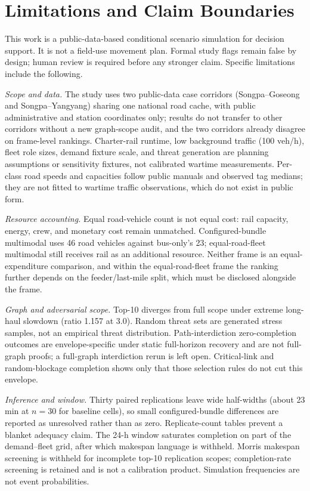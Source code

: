\documentclass{ieeeaccess}
\begin{document}
\section{Limitations and Claim Boundaries}
\label{sec:limits}
This work is a public-data-based conditional scenario simulation for decision support. It is not a field-use movement plan. Formal study flags remain false by design; human review is required before any stronger claim. Specific limitations include the following.

\emph{Scope and data.} The study uses two public-data case corridors (Songpa--Goseong and Songpa--Yangyang) sharing one national road cache, with public administrative and station coordinates only; results do not transfer to other corridors without a new graph-scope audit, and the two corridors already disagree on frame-level rankings. Charter-rail runtime, low background traffic (100 veh/h), fleet role sizes, demand fixture scale, and threat generation are planning assumptions or sensitivity fixtures, not calibrated wartime measurements. Per-class road speeds and capacities follow public manuals and observed tag medians; they are not fitted to wartime traffic observations, which do not exist in public form.

\emph{Resource accounting.} Equal road-vehicle count is not equal cost: rail capacity, energy, crew, and monetary cost remain unmatched. Configured-bundle multimodal uses 46 road vehicles against bus-only's 23; equal-road-fleet multimodal still receives rail as an additional resource. Neither frame is an equal-expenditure comparison, and within the equal-road-fleet frame the ranking further depends on the feeder/last-mile split, which must be disclosed alongside the frame.

\emph{Graph and adversarial scope.} Top-10 diverges from full scope under extreme long-haul slowdown (ratio 1.157 at 3.0). Random threat sets are generated stress samples, not an empirical threat distribution. Path-interdiction zero-completion outcomes are envelope-specific under static full-horizon recovery and are not full-graph proofs; a full-graph interdiction rerun is left open. Critical-link and random-blockage completion shows only that those selection rules do not cut this envelope.

\emph{Inference and window.} Thirty paired replications leave wide half-widths (about 23 min at $n{=}30$ for baseline cells), so small configured-bundle differences are reported as unresolved rather than as zero. Replicate-count tables prevent a blanket adequacy claim. The 24-h window saturates completion on part of the demand--fleet grid, after which makespan language is withheld. Morris makespan screening is withheld for incomplete top-10 replication scopes; completion-rate screening is retained and is not a calibration product. Simulation frequencies are not event probabilities.
\end{document}
